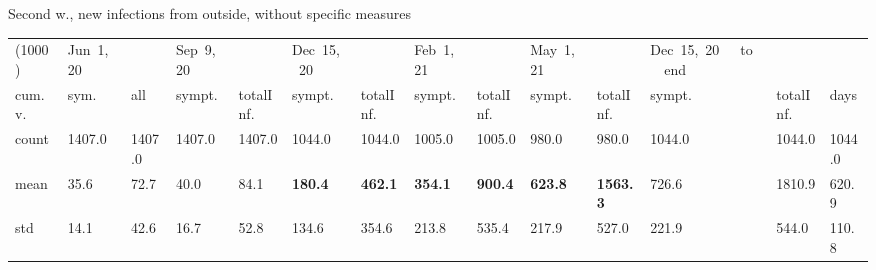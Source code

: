 \documentclass[9pt]{beamer}
\begin{document}
\begin{frame}{Second w., new infections from outside, without specific measures}
\begin{table}[H]
\center
\tiny
\begin{tabular}{p{0.4cm}p{0.3cm}p{0.3cm}p{0.3cm}p{0.3cm}p{0.3cm}p{0.3cm}p{0.3cm}p{0.3cm}p{0.3cm}p{0.3cm}p{0.3cm}p{0.3cm}p{0.4cm}}
\toprule
(1000) &  Jun~1,~20 & &  Sep~9,~20 & & Dec~15,~20 & & Feb~1,~21 & & May~1,~21 & & Dec~15,~20~~~to~~~end   \\
cum.~v. &  sym. &  all &  sympt. &  totalInf. &  sympt. &  totalInf. &  sympt. &  totalInf. &  sympt. &  totalInf. &  sympt. &  totalInf.  & days\\
\midrule
count &   1407.0 &                     1407.0 &   1407.0 &                     1407.0 &   1044.0 &                     1044.0 &   1005.0 &                     1005.0 &    980.0 &                      980.0 &              1044.0 &                  1044.0 & 1044.0 \\
mean  &     35.6 &                       72.7 &     40.0 &                       84.1 &    \textbf{180.4} &                      \textbf{462.1} &    \textbf{354.1} &                      \textbf{900.4} &    \textbf{623.8} &                     \textbf{1563.3} &               726.6 &                  1810.9 &  620.9 \\
std   &     14.1 &                       42.6 &     16.7 &                       52.8 &    134.6 &                      354.6 &    213.8 &                      535.4 &    217.9 &                      527.0 &               221.9 &                   544.0 &  110.8 \\
\bottomrule
\end{tabular}

\label{selForceWave2Tab}
\end{table}


\end{frame}
\end{document}

